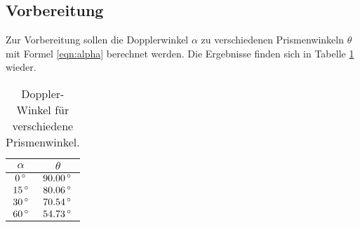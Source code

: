 \subsection{Vorbereitung}
Zur Vorbereitung sollen die Dopplerwinkel $\alpha$ zu verschiedenen Prismenwinkeln
$\theta$
mit Formel \eqref{eqn:alpha} berechnet werden. Die Ergebnisse finden sich in
Tabelle \ref{tab:alpha} wieder.
\begin{table}
  \centering
  \begin{tabular}{c|c}
    \toprule
    $\alpha$ & $\theta$ \\
    \midrule
    $ 0\,\si{\degree}$ & $90.00\,\si{\degree}$ \\
    $15\,\si{\degree}$ & $80.06\,\si{\degree}$ \\
    $30\,\si{\degree}$ & $70.54\,\si{\degree}$ \\
    $60\,\si{\degree}$ & $54.73\,\si{\degree}$ \\
    \bottomrule
  \end{tabular}
  \caption{Doppler-Winkel für verschiedene Prismenwinkel.}
  \label{tab:alpha}
\end{table}
